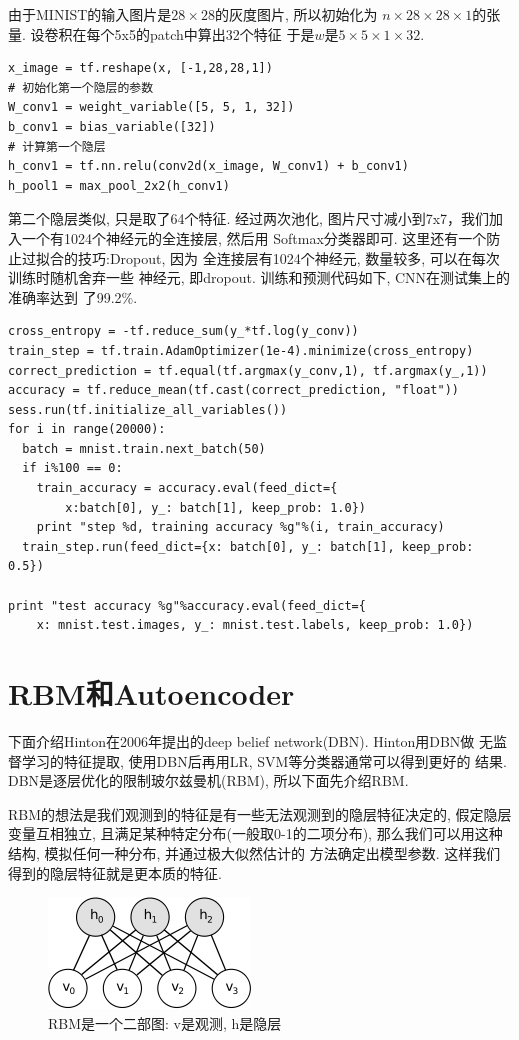 \documentclass{ctexart}
\begin{document}
由于MINIST的输入图片是\(28\times28\)的灰度图片, 所以初始化为
\(n\times28\times28\times1\)的张量. 设卷积在每个5x5的patch中算出32个特征
于是\(w\)是\(5\times5\times1\times32\).
\begin{lstlisting}
x_image = tf.reshape(x, [-1,28,28,1])
# 初始化第一个隐层的参数
W_conv1 = weight_variable([5, 5, 1, 32])
b_conv1 = bias_variable([32])
# 计算第一个隐层
h_conv1 = tf.nn.relu(conv2d(x_image, W_conv1) + b_conv1)
h_pool1 = max_pool_2x2(h_conv1)
\end{lstlisting}
第二个隐层类似, 只是取了64个特征. 经过两次池化,
图片尺寸减小到7x7，我们加入一个有1024个神经元的全连接层, 然后用
Softmax分类器即可. 这里还有一个防止过拟合的技巧:Dropout, 因为
全连接层有1024个神经元, 数量较多, 可以在每次训练时随机舍弃一些
神经元, 即dropout. 训练和预测代码如下, CNN在测试集上的准确率达到
了99.2\%.
\begin{lstlisting}
cross_entropy = -tf.reduce_sum(y_*tf.log(y_conv))
train_step = tf.train.AdamOptimizer(1e-4).minimize(cross_entropy)
correct_prediction = tf.equal(tf.argmax(y_conv,1), tf.argmax(y_,1))
accuracy = tf.reduce_mean(tf.cast(correct_prediction, "float"))
sess.run(tf.initialize_all_variables())
for i in range(20000):
  batch = mnist.train.next_batch(50)
  if i%100 == 0:
    train_accuracy = accuracy.eval(feed_dict={
        x:batch[0], y_: batch[1], keep_prob: 1.0})
    print "step %d, training accuracy %g"%(i, train_accuracy)
  train_step.run(feed_dict={x: batch[0], y_: batch[1], keep_prob: 0.5})

print "test accuracy %g"%accuracy.eval(feed_dict={
    x: mnist.test.images, y_: mnist.test.labels, keep_prob: 1.0})
\end{lstlisting}

\section{RBM和Autoencoder}
下面介绍Hinton在2006年提出的deep belief network(DBN). Hinton用DBN做
无监督学习的特征提取, 使用DBN后再用LR, SVM等分类器通常可以得到更好的
结果. DBN是逐层优化的限制玻尔兹曼机(RBM), 所以下面先介绍RBM.

RBM的想法是我们观测到的特征是有一些无法观测到的隐层特征决定的,
假定隐层变量互相独立, 且满足某种特定分布(一般取0-1的二项分布),
那么我们可以用这种结构, 模拟任何一种分布, 并通过极大似然估计的
方法确定出模型参数. 这样我们得到的隐层特征就是更本质的特征.
\begin{figure}[htb]
  \centering
  \includegraphics[width=.8\textwidth]{rbm}
  \caption{RBM是一个二部图: v是观测, h是隐层}
  \label{fig:rbm}
\end{figure}
\end{document}
